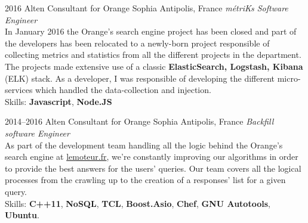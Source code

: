 \documentclass[]{friggeri-cv}
\begin{document}
\begin{entrylist}
  \entry
      {2016}
      {Alten Consultant for Orange}
      {Sophia Antipolis, France}
      {\emph{métriKs Software Engineer} \\
        In January 2016 the Orange's search engine project has been closed
        and part of the developers has been relocated to a newly-born project
        responsible of collecting metrics and statistics from all the different
        projects in the department.  The projects made extensive use of a classic
        \textbf{ElasticSearch, Logstash, Kibana} (ELK) stack.  As a developer, I
        was responsible of developing the different micro-services which handled
        the data-collection and injection. \\
        Skills: \textbf{Javascript}, \textbf{Node.JS}
      }
\end{entrylist}

\begin{entrylist}
  \entry
      {2014--2016}
      {Alten Consultant for Orange}
      {Sophia Antipolis, France}
      {\emph{Backfill software Engineer} \\
        As part of the development team handling all the logic behind the
        Orange's search engine at \href{http://lemoteur.fr}{lemoteur.fr}, we're
        constantly improving our algorithms in order to provide the best answers
        for the users' queries. Our team covers all the logical processes from
        the crawling up to the creation of a responses' list for a given query. \\
        Skills: \textbf{C++11}, \textbf{NoSQL}, \textbf{TCL},
        \textbf{Boost.Asio}, \textbf{Chef}, \textbf{GNU Autotools},
        \textbf{Ubuntu}.
      }
\end{entrylist}
\end{document}
